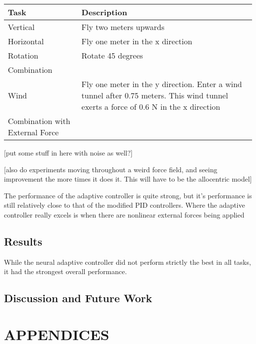 \documentclass[letterpaper,12pt,titlepage,oneside,final]{book}
\begin{document}
\begin{center}
\begin{tabular}{| l | p{9cm} |}

\hline
Task & Description \\ \hline
Vertical & Fly two meters upwards \\ \hline
Horizontal & Fly one meter in the x direction \\ \hline
Rotation & Rotate 45 degrees \\ \hline
Combination & \\ \hline
Wind & Fly one meter in the y direction. Enter a wind tunnel after 0.75 meters. This wind tunnel exerts a force of 0.6 N in the x direction \\ \hline
Combination with External Force & \\ \hline

\end{tabular}
\end{center}

[put some stuff in here with noise as well?]

[also do experiments moving throughout a weird force field, and seeing improvement the more times it does it. This will have to be the allocentric model]

The performance of the adaptive controller is quite strong, but it’s performance is still relatively close to that of the modified PID controllers. Where the adaptive controller really excels is when there are nonlinear external forces being applied

\section{Results}


While the neural adaptive controller did not perform strictly the best in all tasks, it had the strongest overall performance. 

\section{Discussion and Future Work}



\appendix

\chapter*{APPENDICES}
\end{document}
